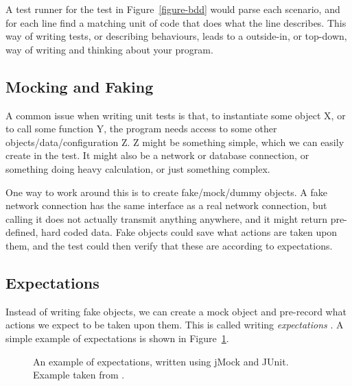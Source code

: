 \documentclass[a4paper,11pt]{kth-mag}
\begin{document}
A test runner for the test in Figure~\ref{figure-bdd} would parse each
scenario, and for each line find a matching unit of code that does what the
line describes. This way of writing tests, or describing behaviours, leads to a
outside-in, or top-down, way of writing and thinking about your program.


\subsection{Mocking and Faking}

A common issue when writing unit tests is that, to instantiate some object X,
or to call some function Y, the program needs access to some other
objects/data/configuration Z. Z might be something simple, which we can easily
create in the test. It might also be a network or database connection, or
something doing heavy calculation, or just something complex.

One way to work around this is to create fake/mock/dummy objects. A fake
network connection has the same interface as a real network connection, but
calling it does not actually transmit anything anywhere, and it might return
pre-defined, hard coded data. Fake objects could save what actions are taken
upon them, and the test could then verify that these are according to
expectations.


\subsection{Expectations}

Instead of writing fake objects, we can create a mock object and pre-record
what actions we expect to be taken upon them. This is called writing
\textit{expectations} \cite{fowler07expectations}. A simple example of
expectations is shown in Figure~\ref{figure-expectations}.

\begin{figure}[h!]
	\begin{center}
	\begin{minipage}{0.7\textwidth}
		\lstset{language=Java}
		
	\end{minipage}
	\end{center}

	\caption{An example of expectations, written using jMock and JUnit.
	Example taken from \cite{fowler07expectations}.}
	\label{figure-expectations}
\end{figure}
\end{document}
